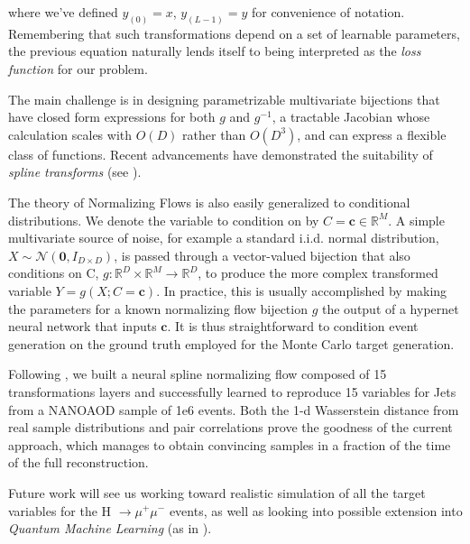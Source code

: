 \documentclass{scrartcl} %
\begin{document}
where we've defined $y_{(0)}=x$, $y_{(L-1)}=y$ for convenience of notation. Remembering that such transformations depend on a set of learnable parameters, the previous equation naturally lends itself to being interpreted as the \emph{loss function} for our problem.

The main challenge is in designing parametrizable multivariate bijections that have closed form expressions for both $g$ and $g^{-1}$, a tractable Jacobian whose calculation scales with $O(D)$ rather than $O(D^3)$, and can express a flexible class of functions. Recent advancements have demonstrated the suitability of \emph{spline transforms} (see \cite{durkan}).

The theory of Normalizing Flows is also easily generalized to conditional distributions. We denote the variable to condition on by $C=\mathbf{c}\in\mathbb{R}^M$. A simple multivariate source of noise, for example a standard i.i.d. normal distribution, $X\sim\mathcal{N}(\mathbf{0},I_{D\times D})$, is passed through a vector-valued bijection that also conditions on C, $g:\mathbb{R}^D\times\mathbb{R}^M\rightarrow\mathbb{R}^D$, to produce the more complex transformed variable $Y=g(X;C=\mathbf{c})$. In practice, this is usually accomplished by making the parameters for a known normalizing flow bijection $g$ the output of a hypernet neural network that inputs $\mathbf{c}$. It is thus straightforward to condition event generation on the ground truth employed for the Monte Carlo target generation.

Following \cite{green2020complete}, we built a  neural spline normalizing flow composed of 15 transformations layers and successfully learned to reproduce 15 variables for Jets from a NANOAOD sample of 1e6 events. Both the 1-d Wasserstein distance from real sample distributions and pair correlations prove the goodness of the current approach, which manages to obtain convincing samples in a fraction of the time of the full reconstruction.

Future work will see us working toward realistic simulation of all the target variables for the  H $\xrightarrow{} \mu^+ \mu^-$ events, as well as looking into possible extension into \emph{Quantum Machine Learning} (as in \cite{chang2021quantum}).

	
	
\end{document}
